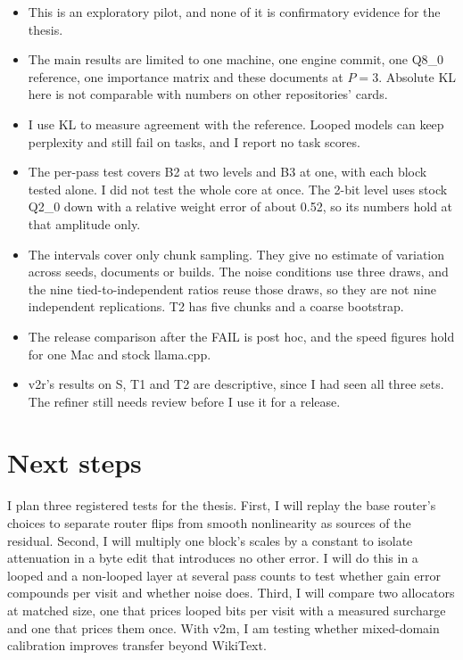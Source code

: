 \documentclass[11pt,a4paper]{article}
\begin{document}
\begin{itemize}
\item This is an exploratory pilot, and none of it is confirmatory evidence for the thesis.
\item The main results are limited to one machine, one engine commit, one Q8\_0 reference, one importance matrix and these documents at $P = 3$. Absolute KL here is not comparable with numbers on other repositories' cards.
\item I use KL to measure agreement with the reference. Looped models can keep perplexity and still fail on tasks, and I report no task scores.
\item The per-pass test covers B2 at two levels and B3 at one, with each block tested alone. I did not test the whole core at once. The 2-bit level uses stock Q2\_0 down with a relative weight error of about 0.52, so its numbers hold at that amplitude only.
\item The intervals cover only chunk sampling. They give no estimate of variation across seeds, documents or builds. The noise conditions use three draws, and the nine tied-to-independent ratios reuse those draws, so they are not nine independent replications. T2 has five chunks and a coarse bootstrap.
\item The release comparison after the FAIL is post hoc, and the speed figures hold for one Mac and stock llama.cpp.
\item v2r's results on S, T1 and T2 are descriptive, since I had seen all three sets. The refiner still needs review before I use it for a release.
\end{itemize}

\section{Next steps}

I plan three registered tests for the thesis. First, I will replay the base router's choices to separate router flips from smooth nonlinearity as sources of the residual. Second, I will multiply one block's scales by a constant to isolate attenuation in a byte edit that introduces no other error. I will do this in a looped and a non-looped layer at several pass counts to test whether gain error compounds per visit and whether noise does. Third, I will compare two allocators at matched size, one that prices looped bits per visit with a measured surcharge and one that prices them once. With v2m, I am testing whether mixed-domain calibration improves transfer beyond WikiText.
\end{document}
